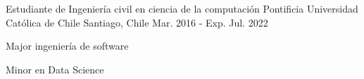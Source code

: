 

\begin{cventries}

  \cventry
  {Estudiante de Ingeniería civil en ciencia de la computación} %
  {Pontificia Universidad Católica de Chile} %
  {Santiago, Chile} %
  {Mar. 2016 - Exp. Jul. 2022} %
  {
    \begin{cvitems} %
      \item {Major ingeniería de software}
      \item {Minor en Data Science}
    \end{cvitems}
  }

\end{cventries}
